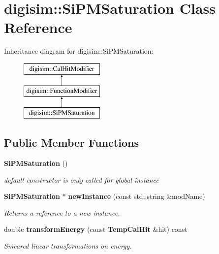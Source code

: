 \section{digisim\-:\-:Si\-P\-M\-Saturation Class Reference}
\label{classdigisim_1_1SiPMSaturation}
Inheritance diagram for digisim\-:\-:Si\-P\-M\-Saturation\-:\begin{figure}[H]
\begin{center}
\leavevmode
\includegraphics[height=3.000000cm]{classdigisim_1_1SiPMSaturation}
\end{center}
\end{figure}
\subsection*{Public Member Functions}
\begin{DoxyCompactItemize}
\item 
{\bf Si\-P\-M\-Saturation} ()\label{classdigisim_1_1SiPMSaturation_a77b92130d1b442ed69650a68415b3ec1}

\begin{DoxyCompactList}\small\item\em default constructor is only called for global instance \end{DoxyCompactList}\item 
{\bf Si\-P\-M\-Saturation} $\ast$ {\bf new\-Instance} (const std\-::string \&mod\-Name)\label{classdigisim_1_1SiPMSaturation_a04904d305e9bf5b811c1b9dff88341d7}

\begin{DoxyCompactList}\small\item\em Returns a reference to a new instance. \end{DoxyCompactList}\item 
double {\bf transform\-Energy} (const {\bf Temp\-Cal\-Hit} \&hit) const \label{classdigisim_1_1SiPMSaturation_ae16cb8ee6fe533c3dc76d6cecfc9a821}

\begin{DoxyCompactList}\small\item\em Smeared linear transformations on energy. \end{DoxyCompactList}\end{DoxyCompactItemize}
